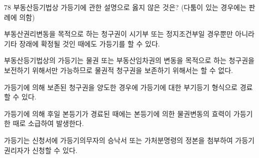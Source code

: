 \begin{question}{78}
부동산등기법상 가등기에 관한 설명으로 옳지 않은 것은? (다툼이 있는 경우에는 판례에 의함)
\begin{choices}
  \item 부동산권리변동을 목적으로 하는 청구권이 시기부 또는 정지조건부일 경우뿐만 아니라 기타 장래에 확정될 것인 때에도 가등기를 할 수 있다.
  \item 부동산등기법상의 가등기는 물권 또는 부동산임차권의 변동을 목적으로 하는 청구권을 보전하기 위해서만 가능하므로 물권적 청구권을 보존하기 위해서는 할 수 없다.
  \item 가등기에 의해 보존된 청구권을 양도한 경우에 가등기에 대한 부기등기 형식으로 경료할 수 있다.
  \item 가등기에 의해 후일 본등기가 경료된 때에는 본등기에 의한 물권변동의 효력이 가등기한 때로 소급하여 발생한다.
  \item 가등기는 신청서에 가등기의무자의 승낙서 또는 가처분명령의 정본을 첨부하여 가등기권리자가 신청할 수 있다.
\end{choices}
\end{question}

